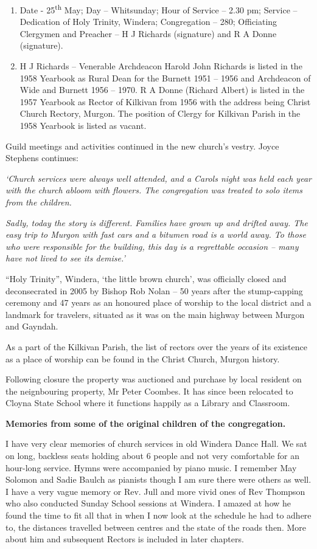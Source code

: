 \begin{enumerate}
\def\labelenumi{\arabic{enumi}.}
\item
  Date - 25\textsuperscript{th} May; Day -- Whitsunday; Hour of Service -- 2.30 pm; Service -- Dedication of Holy Trinity, Windera; Congregation -- 280; Officiating Clergymen and Preacher -- H J Richards (signature) and R A Donne (signature).
\item
  H J Richards -- Venerable Archdeacon Harold John Richards is listed in the 1958 Yearbook as Rural Dean for the Burnett 1951 -- 1956 and Archdeacon of Wide and Burnett 1956 -- 1970. R A Donne (Richard Albert) is listed in the 1957 Yearbook as Rector of Kilkivan from 1956 with the address being Christ Church Rectory, Murgon. The position of Clergy for Kilkivan Parish in the 1958 Yearbook is listed as vacant.
\end{enumerate}

Guild meetings and activities continued in the new church's vestry. Joyce Stephens continues:

\emph{`Church services were always well attended, and a Carols night was held each year with the church abloom with flowers. The congregation was treated to solo items from the children.}

\emph{Sadly, today the story is different. Families have grown up and drifted away. The easy trip to Murgon with fast cars and a bitumen road is a world away. To those who were responsible for the building, this day is a regrettable occasion -- many have not lived to see its demise.'}

``Holy Trinity'', Windera, `the little brown church', was officially closed and deconsecrated in 2005 by Bishop Rob Nolan -- 50 years after the stump-capping ceremony and 47 years as an honoured place of worship to the local district and a landmark for travelers, situated as it was on the main highway between Murgon and Gayndah.

As a part of the Kilkivan Parish, the list of rectors over the years of its existence as a place of worship can be found in the Christ Church, Murgon history.

Following closure the property was auctioned and purchase by local resident on the neignbouring property, Mr Peter Coombes. It has since been relocated to Cloyna State School where it functions happily as a Library and Classroom.

\textbf{Memories from some of the original children of the congregation.}

I have very clear memories of church services in old Windera Dance Hall. We sat on long, backless seats holding about 6 people and not very comfortable for an hour-long service. Hymns were accompanied by piano music. I remember May Solomon and Sadie Baulch as pianists though I am sure there were others as well. I have a very vague memory or Rev. Jull and more vivid ones of Rev Thompson who also conducted Sunday School sessions at Windera. I amazed at how he found the time to fit all that in when I now look at the schedule he had to adhere to, the distances travelled between centres and the state of the roads then. More about him and subsequent Rectors is included in later chapters.

